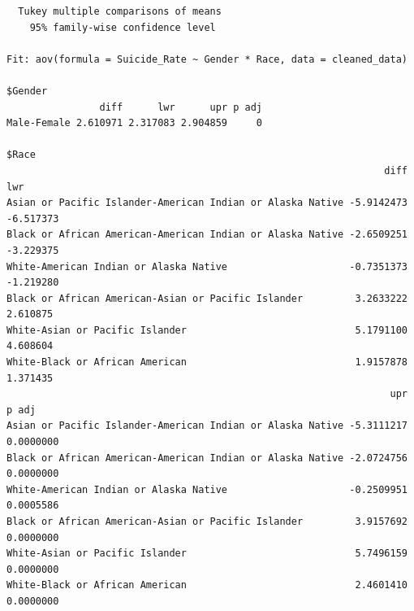\documentclass[
  letterpaper,
  DIV=11,
  numbers=noendperiod]{scrartcl}
\begin{document}
\begin{verbatim}
  Tukey multiple comparisons of means
    95% family-wise confidence level

Fit: aov(formula = Suicide_Rate ~ Gender * Race, data = cleaned_data)

$Gender
                diff      lwr      upr p adj
Male-Female 2.610971 2.317083 2.904859     0

$Race
                                                                 diff       lwr
Asian or Pacific Islander-American Indian or Alaska Native -5.9142473 -6.517373
Black or African American-American Indian or Alaska Native -2.6509251 -3.229375
White-American Indian or Alaska Native                     -0.7351373 -1.219280
Black or African American-Asian or Pacific Islander         3.2633222  2.610875
White-Asian or Pacific Islander                             5.1791100  4.608604
White-Black or African American                             1.9157878  1.371435
                                                                  upr     p adj
Asian or Pacific Islander-American Indian or Alaska Native -5.3111217 0.0000000
Black or African American-American Indian or Alaska Native -2.0724756 0.0000000
White-American Indian or Alaska Native                     -0.2509951 0.0005586
Black or African American-Asian or Pacific Islander         3.9157692 0.0000000
White-Asian or Pacific Islander                             5.7496159 0.0000000
White-Black or African American                             2.4601410 0.0000000


\end{verbatim}
\end{document}

